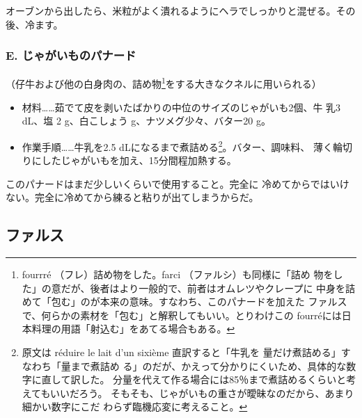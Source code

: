 \begin{recette}
オーブンから出したら、米粒がよく潰れるようにヘラでしっかりと混ぜる。その後、冷ます。

\hypertarget{panade-e}{%
\subsubsection{E. じゃがいものパナード}\label{panade-e}}



（仔牛および他の白身肉の、詰め物\footnote{fourrré
  （フレ）詰め物をした。farci （ファルシ）も同様に「詰め
  物をした」の意だが、後者はより一般的で、前者はオムレツやクレープに
  中身を詰めて「包む」のが本来の意味。すなわち、このパナードを加えた
  ファルスで、何らかの素材を「包む」と解釈してもいい。とりわけこの
  fourréには日本料理の用語「射込む」をあてる場合もある。}をする大きなクネルに用いられる）

\begin{itemize}
\item
  材料\ldots{}\ldots{}茹でて皮を剥いたばかりの中位のサイズのじゃがいも2個、牛
  乳3 dL、塩 2 g、白こしょう\undemi{} g、ナツメグ少々、バター20 g。
\item
  作業手順\ldots{}\ldots{}牛乳を2.5 dLになるまで煮詰める\footnote{原文は
    réduire le lait d'un sixième 直訳すると「牛乳を
    \unsixieme{}量だけ煮詰める」すなわち「\cinqsixiemes{}量まで煮詰め
    る」のだが、かえって分かりにくいため、具体的な数字に直して訳した。
    分量を代えて作る場合には85％まで煮詰めるくらいと考えてもいいだろう。
    そもそも、じゃがいもの重さが曖昧なのだから、あまり細かい数字にこだ
    わらず臨機応変に考えること。}。バター、調味料、
  薄く輪切りにしたじゃがいもを加え、15分間程加熱する。
\end{itemize}

このパナードはまだ少しいくらいで使用すること。完全に
冷めてからではいけない。完全に冷めてから練ると粘りが出てしまうからだ。
\end{recette}
\hypertarget{farces}{%
\subsection{ファルス}\label{farces}}

